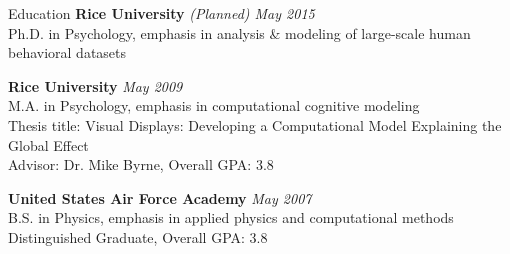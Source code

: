  
\begin{rSection}{Education}
  {\bf Rice University} \hfill {\em (Planned) May 2015} \\
  Ph.D. in Psychology, emphasis in analysis \& modeling of large-scale human behavioral datasets
\item {\bf Rice University} \hfill {\em May 2009} \\ 
  M.A. in Psychology, emphasis in computational cognitive modeling \\
  Thesis title: Visual Displays: Developing a Computational Model Explaining the Global Effect \\
  Advisor: Dr. Mike Byrne, Overall GPA: 3.8
\item {\bf United States Air Force Academy} \hfill {\em May 2007} \\ 
  B.S. in Physics, emphasis in applied physics and computational methods \\
  Distinguished Graduate, Overall GPA: 3.8 
\end{rSection}

